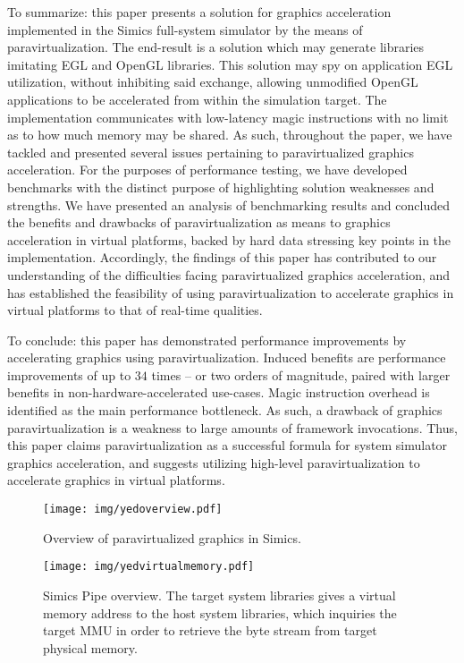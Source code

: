 \documentclass{article}
\begin{document}
To summarize: this paper presents a solution for graphics acceleration implemented in the Simics full-system simulator by the means of paravirtualization.
The end-result is a solution which may generate libraries imitating EGL and OpenGL libraries.
This solution may spy on application EGL utilization, without inhibiting said exchange, allowing unmodified OpenGL applications to be accelerated from within the simulation target.
The implementation communicates with low-latency magic instructions with no limit as to how much memory may be shared.
As such, throughout the paper, we have tackled and presented several issues pertaining to paravirtualized graphics acceleration.
For the purposes of performance testing, we have developed benchmarks with the distinct purpose of highlighting solution weaknesses and strengths.
We have presented an analysis of benchmarking results and concluded the benefits and drawbacks of paravirtualization as means to graphics acceleration in virtual platforms, backed by hard data stressing key points in the implementation.
Accordingly, the findings of this paper has contributed to our understanding of the difficulties facing paravirtualized graphics acceleration, and has established the feasibility of using paravirtualization to accelerate graphics in virtual platforms to that of real-time qualities.

To conclude: this paper has demonstrated performance improvements by accelerating graphics using paravirtualization.
Induced benefits are performance improvements of up to $34$ times -- or two orders of magnitude, paired with larger benefits in non-hardware-accelerated use-cases.
Magic instruction overhead is identified as the main performance bottleneck.
As such, a drawback of graphics paravirtualization is a weakness to large amounts of framework invocations.
Thus, this paper claims paravirtualization as a successful formula for system simulator graphics acceleration, and suggests utilizing high-level paravirtualization to accelerate graphics in virtual platforms.




\begin{figure}
\centering
\texttt{[image: img/yedoverview.pdf]}
\caption{Overview of paravirtualized graphics in Simics.}
\label{fig:overview}
\end{figure}

\begin{figure}
\centering
\texttt{[image: img/yedvirtualmemory.pdf]}
\caption{Simics Pipe overview. The target system libraries gives a virtual memory address to the host system libraries, which inquiries the target MMU in order to retrieve the byte stream from target physical memory.}
\label{fig:virtualmemory}
\end{figure}
\end{document}
